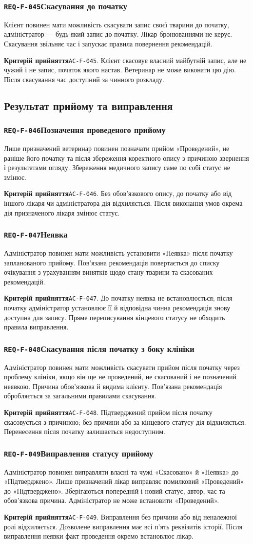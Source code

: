 \documentclass[11pt,a4paper]{article}
\newcommand{\requirement}[4]{%
  \Needspace{7\baselineskip}%
  \subsubsection*{\hypertarget{#1}{\texttt{#1}}\quad #2}%
  #3\par
  \textbf{Критерій прийняття}\quad #4\par\medskip}
\begin{document}
\requirement{REQ-F-045}{Скасування до початку}{Клієнт повинен мати можливість скасувати запис своєї тварини до початку, адміністратор — будь-який запис до початку. Лікар бронюваннями не керує. Скасування звільняє час і запускає правила повернення рекомендацій.}{\hypertarget{AC-F-045}{\texttt{AC-F-045}}. Клієнт скасовує власний майбутній запис, але не чужий і не запис, початок якого настав. Ветеринар не може виконати цю дію. Після скасування час доступний за чинного розкладу.}

\subsection{Результат прийому та виправлення}
\requirement{REQ-F-046}{Позначення проведеного прийому}{Лише призначений ветеринар повинен позначати прийом «Проведений», не раніше його початку та після збереження коректного опису з причиною звернення і результатами огляду. Збереження медичного запису саме по собі статус не змінює.}{\hypertarget{AC-F-046}{\texttt{AC-F-046}}. Без обов’язкового опису, до початку або від іншого лікаря чи адміністратора дія відхиляється. Після виконання умов окрема дія призначеного лікаря змінює статус.}

\requirement{REQ-F-047}{Неявка}{Адміністратор повинен мати можливість установити «Неявка» після початку запланованого прийому. Пов’язана рекомендація повертається до списку очікування з урахуванням винятків щодо стану тварини та скасованих рекомендацій.}{\hypertarget{AC-F-047}{\texttt{AC-F-047}}. До початку неявка не встановлюється; після початку адміністратор установлює її й відповідна чинна рекомендація знову доступна для запису. Пряме переписування кінцевого статусу не обходить правила виправлення.}

\requirement{REQ-F-048}{Скасування після початку з боку клініки}{Адміністратор повинен мати можливість скасувати прийом після початку через проблему клініки, якщо він ще не проведений, не скасований і не позначений неявкою. Причина обов’язкова й видима клієнту. Пов’язана рекомендація обробляється за загальними правилами скасування.}{\hypertarget{AC-F-048}{\texttt{AC-F-048}}. Підтверджений прийом після початку скасовується з причиною; без причини або за кінцевого статусу дія відхиляється. Перенесення після початку залишається недоступним.}

\requirement{REQ-F-049}{Виправлення статусу прийому}{Адміністратор повинен виправляти власні та чужі «Скасовано» й «Неявка» до «Підтверджено». Лише призначений лікар виправляє помилковий «Проведений» до «Підтверджено». Зберігаються попередній і новий статус, автор, час та обов’язкова причина. Адміністратор не може встановити «Проведений».}{\hypertarget{AC-F-049}{\texttt{AC-F-049}}. Виправлення без причини або від неналежної ролі відхиляється. Дозволене виправлення має всі п’ять реквізитів історії. Після виправлення неявки факт проведення окремо встановлює лікар.}
\end{document}
